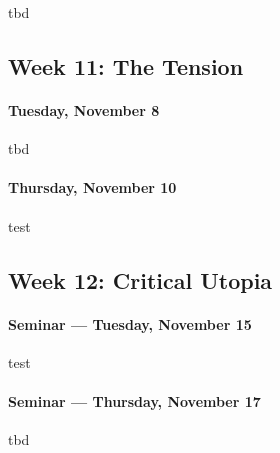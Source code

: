       \begin{itemize*}
      \item tbd
    \end{itemize*}
    
    
    \subsection{\textbf{Week 11}: The Tension}
    
\paragraph{Tuesday, November 8}
    
    \begin{itemize*}
    \item tbd
    \end{itemize*}

    
\paragraph{Thursday, November 10}
    
    \begin{itemize*}
    \item test	
    \end{itemize*}	
    
    \subsection{\textbf{Week 12}: Critical Utopia}
    
    \paragraph{Seminar --- Tuesday, November 15}
    
    \begin{itemize*}
    \item test
    \end{itemize*}
    
    
    \paragraph{Seminar --- Thursday, November 17}
    
    \begin{itemize*}
    \item tbd
    \end{itemize*}	
    

